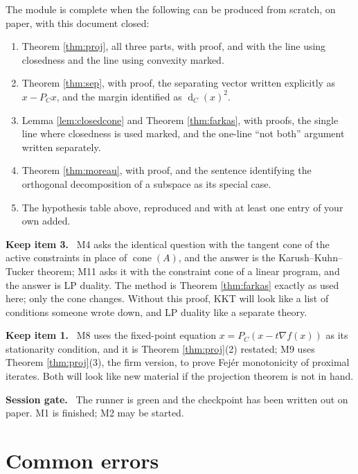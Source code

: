 \documentclass[11pt,a4paper]{article}
\newcommand{\mpart}[1]{\smallskip\noindent\textbf{#1}\ \ignorespaces}
\theoremstyle{definition}
\theoremstyle{plain}
\theoremstyle{remark}
\newcommand{\proj}{P}
\DeclareMathOperator{\cone}{cone}
\DeclareMathOperator{\dist}{d}
\begin{document}
The module is complete when the following can be produced from scratch, on paper, with this
document closed:

\begin{enumerate}
\item Theorem \ref{thm:proj}, all three parts, with proof, and with the line using closedness
and the line using convexity marked.
\item Theorem \ref{thm:sep}, with proof, the separating vector written explicitly as
$x-\proj_Cx$, and the margin identified as $\dist_C(x)^2$.
\item Lemma \ref{lem:closedcone} and Theorem \ref{thm:farkas}, with proofs, the single line
where closedness is used marked, and the one-line ``not both'' argument written separately.
\item Theorem \ref{thm:moreau}, with proof, and the sentence identifying the orthogonal
decomposition of a subspace as its special case.
\item The hypothesis table above, reproduced and with at least one entry of your own added.
\end{enumerate}

\mpart{Keep item 3.} M4 asks the identical question with the tangent cone of the active
constraints in place of $\cone(A)$, and the answer is the Karush--Kuhn--Tucker theorem; M11 asks
it with the constraint cone of a linear program, and the answer is LP duality. The method is
Theorem \ref{thm:farkas} exactly as used here; only the cone changes. Without this proof, KKT
will look like a list of conditions someone wrote down, and LP duality like a separate theory.

\mpart{Keep item 1.} M8 uses the fixed-point equation $x=\proj_C(x-t\nabla f(x))$ as its
stationarity condition, and it is Theorem \ref{thm:proj}(2) restated; M9 uses Theorem
\ref{thm:proj}(3), the firm version, to prove Fej\'er monotonicity of proximal iterates. Both
will look like new material if the projection theorem is not in hand.

\mpart{Session gate.} The runner is green and the checkpoint has been written out on paper. M1
is finished; M2 may be started.

\clearpage

\section{Common errors}
\end{document}
